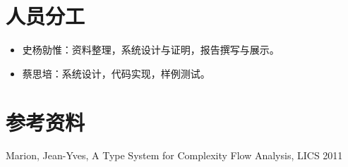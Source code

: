 \documentclass{ctexart}
\begin{document}
\section{人员分工}
\begin{itemize}
\item 史杨勍惟：资料整理，系统设计与证明，报告撰写与展示。
\item 蔡思培：系统设计，代码实现，样例测试。
\end{itemize}
\section{参考资料}
Marion, Jean-Yves, A Type System for Complexity Flow Analysis, LICS 2011

	
\end{document}
